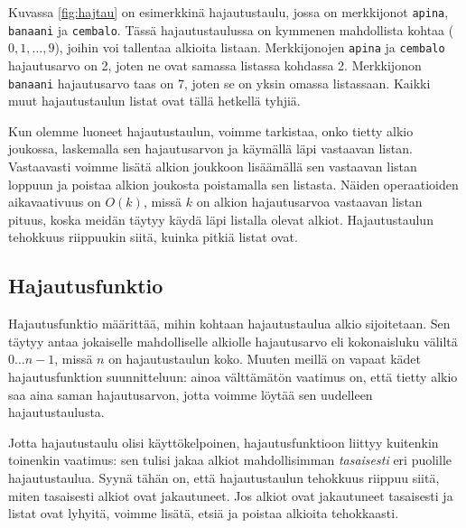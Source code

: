 Kuvassa \ref{fig:hajtau} on esimerkkinä hajautustaulu, jossa on
merkkijonot \texttt{apina}, \texttt{banaani} ja \texttt{cembalo}.
Tässä hajautustaulussa on kymmenen mahdollista kohtaa
($0,1,\ldots,9$), joihin voi tallentaa alkioita listaan.
Merkkijonojen \texttt{apina} ja \texttt{cembalo}
hajautusarvo on 2, joten ne ovat samassa listassa kohdassa 2.
Merkkijonon \texttt{banaani} hajautusarvo taas on 7,
joten se on yksin omassa listassaan.
Kaikki muut hajautustaulun listat ovat tällä hetkellä tyhjiä.

Kun olemme luoneet hajautustaulun, voimme tarkistaa,
onko tietty alkio joukossa, laskemalla sen hajautusarvon
ja käymällä läpi vastaavan listan.
Vastaavasti voimme lisätä alkion joukkoon
lisäämällä sen vastaavan listan loppuun ja poistaa
alkion joukosta poistamalla sen listasta.
Näiden operaatioiden aikavaativuus on $O(k)$,
missä $k$ on alkion hajautusarvoa vastaavan listan pituus,
koska meidän täytyy käydä läpi listalla olevat alkiot.
Hajautustaulun tehokkuus riippuukin siitä,
kuinka pitkiä listat ovat.

\subsection{Hajautusfunktio}

Hajautusfunktio määrittää, mihin kohtaan hajautustaulua
alkio sijoitetaan.
Sen täytyy antaa jokaiselle mahdolliselle alkiolle
hajautusarvo eli kokonaisluku väliltä $0 \dots n-1$,
missä $n$ on hajautustaulun koko.
Muuten meillä on vapaat kädet hajautusfunktion suunnitteluun:
ainoa välttämätön vaatimus on, että tietty alkio saa aina
saman hajautusarvon, jotta voimme löytää sen uudelleen
hajautustaulusta.

Jotta hajautustaulu olisi käyttökelpoinen, hajautusfunktioon
liittyy kuitenkin toinenkin vaatimus:
sen tulisi jakaa alkiot mahdollisimman \emph{tasaisesti}
eri puolille hajautustaulua.
Syynä tähän on, että hajautustaulun tehokkuus riippuu siitä,
miten tasaisesti alkiot ovat jakautuneet.
Jos alkiot ovat jakautuneet tasaisesti ja listat ovat lyhyitä,
voimme lisätä, etsiä ja poistaa alkioita tehokkaasti.

